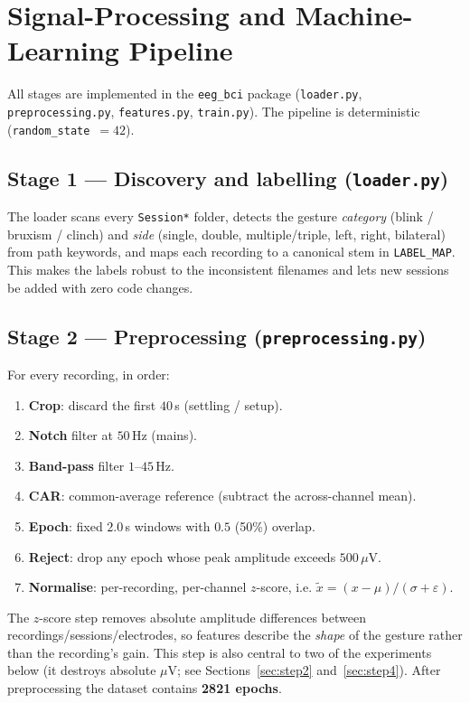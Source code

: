 \documentclass[11pt,a4paper]{article}
\newcommand{\muv}{$\mu$V}
\newcommand{\code}[1]{\texttt{#1}}
\begin{document}
\section{Signal-Processing and Machine-Learning Pipeline}
All stages are implemented in the \code{eeg\_bci} package
(\code{loader.py}, \code{preprocessing.py}, \code{features.py},
\code{train.py}). The pipeline is deterministic (\code{random\_state}~$=42$).

\subsection{Stage 1 --- Discovery and labelling (\code{loader.py})}
The loader scans every \code{Session*} folder, detects the gesture
\emph{category} (blink / bruxism / clinch) and \emph{side} (single, double,
multiple/triple, left, right, bilateral) from path keywords, and maps each
recording to a canonical stem in \code{LABEL\_MAP}. This makes the labels robust
to the inconsistent filenames and lets new sessions be added with zero code
changes.

\subsection{Stage 2 --- Preprocessing (\code{preprocessing.py})}
For every recording, in order:
\begin{enumerate}[noitemsep]
  \item \textbf{Crop}: discard the first $40$\,s (settling / setup).
  \item \textbf{Notch} filter at $50$\,Hz (mains).
  \item \textbf{Band-pass} filter $1$--$45$\,Hz.
  \item \textbf{CAR}: common-average reference (subtract the across-channel mean).
  \item \textbf{Epoch}: fixed $2.0$\,s windows with $0.5$ (50\%) overlap.
  \item \textbf{Reject}: drop any epoch whose peak amplitude exceeds $500$\,\muv.
  \item \textbf{Normalise}: per-recording, per-channel $z$-score, i.e.
  $\tilde{x}=(x-\mu)/(\sigma+\varepsilon)$.
\end{enumerate}
The $z$-score step removes absolute amplitude differences between
recordings/sessions/electrodes, so features describe the \emph{shape} of the
gesture rather than the recording's gain. This step is also central to two of
the experiments below (it destroys absolute \muv{}; see Sections~\ref{sec:step2}
and~\ref{sec:step4}). After preprocessing the dataset contains
\textbf{2821 epochs}.
\end{document}
